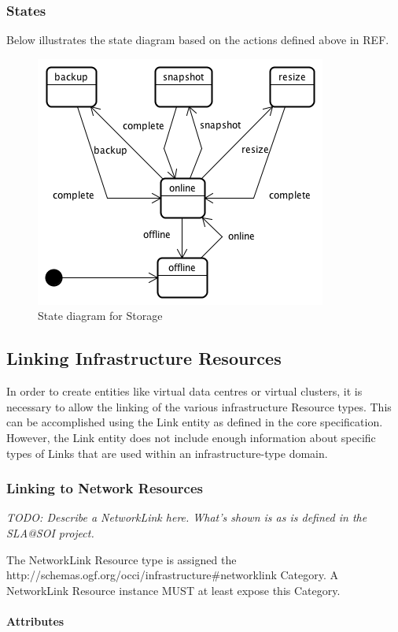 \documentclass[10pt,a4paper]{article}
\begin{document}
\subsubsection{States}
Below illustrates the state diagram based on the actions defined above in REF.

\begin{figure}[!h]
	\centering
	\includegraphics[scale=0.4]{dia/storage-state.png}
	\caption{State diagram for Storage}
	\label{fig:storage_state}
\end{figure}

\subsection{Linking Infrastructure Resources}
In order to create entities like virtual data centres or virtual clusters, it is necessary to allow the linking of the various infrastructure Resource types. This can be accomplished using the Link entity as defined in the core specification. However, the Link entity does not include enough information about specific types of Links that are used within an infrastructure-type domain.
\subsubsection{Linking to Network Resources}
\textit{TODO: Describe a NetworkLink here. What's shown is as is defined in the SLA@SOI project.}

The NetworkLink Resource type is assigned the http://schemas.ogf.org/occi/infrastructure\#networklink Category. A NetworkLink Resource instance MUST at least expose this Category.
\paragraph{Attributes}
\end{document}
